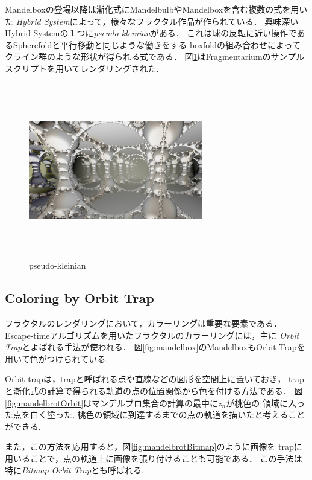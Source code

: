 Mandelboxの登場以降は漸化式にMandelbulbやMandelboxを含む複数の式を用いた
{\it Hybrid System}によって，様々なフラクタル作品が作られている．
興味深いHybrid Systemの１つに{\it pseudo-kleinian}がある．
これは球の反転に近い操作であるSpherefoldと平行移動と同じような働きをする
boxfoldの組み合わせによってクライン群のような形状が得られる式である．
図\ref{fig:pseudoKleinian}はFragmentariumのサンプルスクリプトを用いてレンダリングされた.

\begin{figure}[htbp]
  \begin{center}
   \includegraphics[width=3in, height=3in, keepaspectratio]{../img/fractal/pseudoKleinian.pdf}
   \caption{pseudo-kleinian}
   \label{fig:pseudoKleinian}
  \end{center}
\end{figure}


\subsection{Coloring by Orbit Trap}

フラクタルのレンダリングにおいて，カラーリングは重要な要素である．
Escape-timeアルゴリズムを用いたフラクタルのカラーリングには，主に{\it
Orbit Trap}とよばれる手法が使われる．
図\ref{fig:mandelbox}のMandelboxもOrbit Trapを用いて色がつけられている.

Orbit trapは，trapと呼ばれる点や直線などの図形を空間上に置いておき，
trapと漸化式の計算で得られる軌道の点の位置関係から色を付ける方法である．
図\ref{fig:mandelbrotOrbit}はマンデルブロ集合の計算の最中に$z_n$が桃色の
領域に入った点を白く塗った.
桃色の領域に到達するまでの点の軌道を描いたと考えることができる.

また，この方法を応用すると，図\ref{fig:mandelbrotBitmap}のように画像を
trapに用いることで，点の軌道上に画像を張り付けることも可能である．
この手法は特に{\it Bitmap Orbit Trap}とも呼ばれる.

